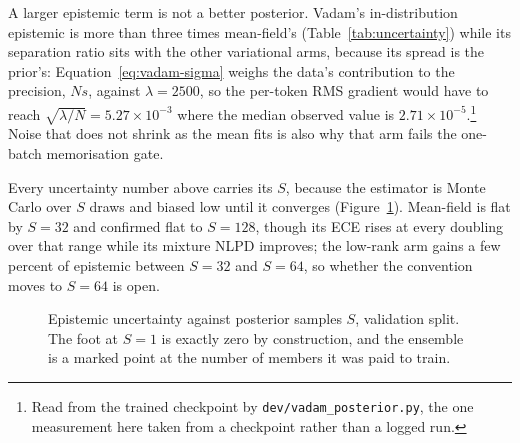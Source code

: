 \begin{table}[t]
  \centering
  
  \caption{Epistemic uncertainty on the off-distribution stream, in nats, stated once
  per arm: the stream is one fixed synthetic sequence, so only the ratio's
  denominator is split-dependent.}
  \label{tab:ood}
\end{table}

A larger epistemic term is not a better posterior. Vadam's in-distribution epistemic
is more than three times mean-field's (Table~\ref{tab:uncertainty}) while its
separation ratio sits with the other variational arms, because its spread is the
prior's: Equation~\ref{eq:vadam-sigma} weighs the data's contribution to the precision,
$N s$, against $\lambda = 2500$, so the per-token RMS gradient would have to reach
$\sqrt{\lambda / N} = 5.27 \times 10^{-3}$ where the median observed value is $2.71
\times 10^{-5}$.\footnote{Read from the trained checkpoint by
\texttt{dev/vadam\_posterior.py}, the one measurement here taken from a checkpoint
rather than a logged run.} Noise that does not shrink as the mean fits is also why that
arm fails the one-batch memorisation gate.

Every uncertainty number above carries its $S$, because the estimator is Monte Carlo
over $S$ draws and biased low until it converges
(Figure~\ref{fig:s-convergence}). Mean-field is flat by $S = 32$ and confirmed flat to
$S = 128$, though its ECE rises at every doubling over that range while its mixture
NLPD improves; the low-rank arm gains a few percent of epistemic between $S = 32$ and
$S = 64$, so whether the convention moves to $S = 64$ is open.

\begin{figure}[t]
  \centering
  
  \caption{Epistemic uncertainty against posterior samples $S$, validation split. The
  foot at $S = 1$ is exactly zero by construction, and the ensemble is a marked point
  at the number of members it was paid to train.}
  \label{fig:s-convergence}
\end{figure}
